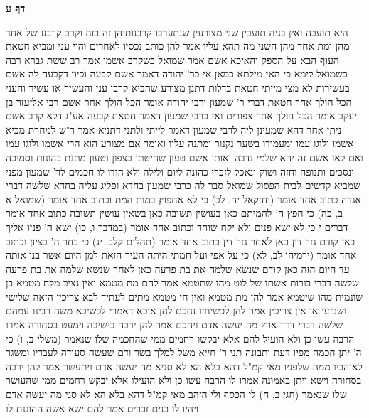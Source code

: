 \documentclass[12pt, openany]{book}
\newcommand{\sethebfont}{
\fontsize{10.5pt}{21.0pt} \selectfont
}
\newcommand{\twocol}[1]{
	{\sethebfont \begin{multicols}{2}
			#1
	\end{multicols}}	
}
\newcommand{\sectname}{}
\newcommand{\newsection}[1]{
	\addcontentsline{toc}{section}{#1}
	\renewcommand{\sectname}{#1}	
	\vspace{-\baselineskip}
	\begin{center}
		\textbf{%
\fontsize{16pt}{16pt}\selectfont
			#1}
	\end{center}
	\vspace{-\baselineskip}
	\nopagebreak
}
\begin{document}
\newsection{דף ע}
\twocol{היא תועבה ואין בניה תועבין 
שני מצורעין שנתערבו קרבנותיהן זה בזה וקרב קרבנו של אחד מהן ומת אחד מהן השני מה תהא עליו 
אמר להן כותב נכסיו לאחרים והוי עני ומביא חטאת העוף הבא על הספק 
והאיכא אשם אמר שמואל כשקרב אשמו 
אמר רב ששת גברא רבה כשמואל לימא כי האי מילתא כמאן אי כר' יהודה דאמר אשם קבעה וכיון דקבעה לה אשם בעשירות לא מצי מייתי חטאת בדלות 
דתנן מצורע שהביא קרבן עני והעשיר או עשיר והעני הכל הולך אחר חטאת דברי ר' שמעון 
ורבי יהודה אומר הכל הולך אחר אשם רבי אליעזר בן יעקב אומר הכל הולך אחר צפורים 
ואי כרבי שמעון דאמר חטאת קבעה אע"ג דלא קרב אשם ניתי אחר דהא שמעינן ליה לרבי שמעון דאמר לייתי ולתני 
דתניא אמר ר"ש למחרת מביא אשמו ולוגו עמו ומעמידו בשער נקנור ומתנה עליו ואומר אם מצורע הוא הרי אשמו ולוגו עמו ואם לאו אשם זה יהא שלמי נדבה 
ואותו אשם טעון
שחיטתו בצפון וטעון מתנת בהונות וסמיכה ונסכים ותנופה וחזה ושוק ונאכל לזכרי כהונה ליום ולילה 
ולא הודו לו חכמים לר' שמעון מפני שמביא קדשים לבית הפסול 
שמואל סבר לה כרבי שמעון בחדא ופליג עליה בחדא
שלשה דברי אגדה כתוב אחד אומר (יחזקאל יח, לב) כי לא אחפוץ במות המת וכתוב אחד אומר (שמואל א ב, כה) כי חפץ ה' להמיתם כאן בעושין תשובה כאן בשאין עושין תשובה 
כתוב אחד אומר {דברים י } כי לא ישא פנים ולא יקח שוחד וכתוב אחד אומר (במדבר ו, כו) ישא ה' פניו אליך כאן קודם גזר דין כאן לאחר גזר דין 
כתוב אחד אומר (תהלים קלב, יג) כי בחר ה' בציון וכתוב אחד אומר (ירמיהו לב, לא) כי על אפי ועל חמתי היתה העיר הזאת למן היום אשר בנו אותה עד היום הזה כאן קודם שנשא שלמה את בת פרעה כאן לאחר שנשא שלמה את בת פרעה
שלשה דברי בורות אשתו של לוט מהו שתטמא אמר להם מת מטמא ואין נציב מלח מטמא 
בן שונמית מהו שיטמא אמר להן מת מטמא ואין חי מטמא 
מתים לעתיד לבא צריכין הזאה שלישי ושביעי או אין צריכין אמר להן לכשיחיו נחכם להן איכא דאמרי לכשיבא משה רבינו עמהם
שלשה דברי דרך ארץ מה יעשה אדם ויחכם אמר להן ירבה בישיבה וימעט בסחורה אמרו הרבה עשו כן ולא הועיל להם אלא יבקשו רחמים ממי שהחכמה שלו שנאמר (משלי ב, ו) כי ה' יתן חכמה מפיו דעת ותבונה 
תני ר' חייא משל למלך בשר ודם שעשה סעודה לעבדיו ומשגר לאוהביו ממה שלפניו 
מאי קמ"ל דהא בלא הא לא סגיא 
מה יעשה אדם ויתעשר אמר להן ירבה בסחורה וישא ויתן באמונה אמרו לו הרבה עשו כן ולא הועילו אלא יבקש רחמים ממי שהעושר שלו שנאמר (חגי ב, ח) לי הכסף ולי הזהב 
מאי קמ"ל דהא בלא הא לא סגי
מה יעשה אדם ויהיו לו בנים זכרים אמר להם ישא אשה ההוגנת לו}
\end{document}
